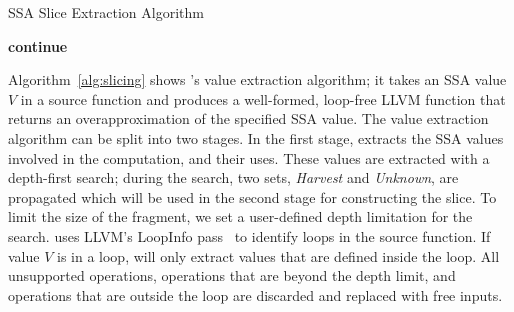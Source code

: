 \begin{algorithm}[tbp]
  \small
  \caption{\small{SSA Slice Extraction Algorithm}}
  \begin{algorithmic}[1]
  \State \textbf{continue}
  \EndIf
  \EndIf
  \EndIf
  \EndIf

  \Else

    \EndFor
  \EndIf

    \EndIf

  \EndWhile
  \EndFunction
  \end{algorithmic}
  \label{alg:slicing}
\end{algorithm}

Algorithm~\ref{alg:slicing} shows \tool's value extraction algorithm;
it takes an SSA value $V$ in a source function and produces a well-formed,
loop-free LLVM function that returns an overapproximation of the
specified SSA value.
%
The value extraction algorithm can be split into two stages.
%
In the first stage, \tool{} extracts the SSA values involved in
the computation, and their uses.
%
These values are extracted with a depth-first search; during the
search, two sets, \emph{Harvest} and \emph{Unknown},
are propagated which will be used in the second stage
for constructing the slice.
%
To limit the size of the fragment, we set a user-defined depth limitation for
the search.
%
\tool{} uses LLVM's LoopInfo pass~\cite{loopinfo} to identify loops in the
source function.
%
If value $V$ is in a loop, \tool{} will only extract values that are defined
inside the loop.
%
All unsupported operations, operations that are beyond the depth limit, and
operations that are outside the loop are discarded and replaced with free inputs.

